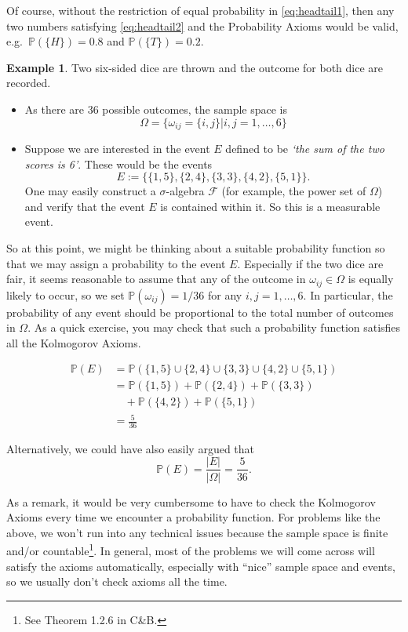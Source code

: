 \documentclass[
]{book}
\newcommand{\bbP}{\mathbb{P}}
\newcommand{\cF}{{\mathcal F}}
\theoremstyle{definition}
\theoremstyle{definition}
\newtheorem{example}{Example}[chapter]
\theoremstyle{definition}
\theoremstyle{definition}
\theoremstyle{remark}
\begin{document}
Of course, without the restriction of equal probability in \eqref{eq:headtail1}, then any two numbers satisfying \eqref{eq:headtail2} and the Probability Axioms would be valid, e.g.~\(\bbP(\{H\})= 0.8\) and \(\bbP(\{T\}) = 0.2.\)

\begin{example}
Two six-sided dice are thrown and the outcome for both dice are recorded.

\begin{itemize}
\item
  As there are 36 possible outcomes, the sample space is
  \[
  \Omega = \big\{ \omega_{ij}=\{i,j\} | i,j =1,\dots,6 \big\}
  \]
\item
  Suppose we are interested in the event \(E\) defined to be \emph{`the sum of the two scores is 6'}. These would be the events
  \[
  E := \big\{ \{1,5\}, \{2,4\}, \{3,3\}, \{4,2\}, \{5,1\} \big\}.
  \]
  One may easily construct a \(\sigma\)-algebra \(\cF\) (for example, the power set of \(\Omega\)) and verify that the event \(E\) is contained within it. So this is a measurable event.
\end{itemize}

So at this point, we might be thinking about a suitable probability function so that we may assign a probability to the event \(E\).
Especially if the two dice are fair, it seems reasonable to assume that any of the outcome in \(\omega_{ij}\in\Omega\) is equally likely to occur, so we set \(\bbP(\omega_{ij}) = 1/36\) for any \(i,j =1,\dots,6\).
In particular, the probability of any event should be proportional to the total number of outcomes in \(\Omega\).
As a quick exercise, you may check that such a probability function satisfies all the Kolmogorov Axioms.

\begin{align*}
\bbP(E) &= 
\bbP\left( \{1,5\} \cup \{2,4\} \cup \{3,3\} \cup \{4,2\} \cup \{5,1\} \right) \\
&= \bbP( \{1,5\}) + \bbP(\{2,4\}) + \bbP(\{3,3\}) \\
& \hspace{1em} + \bbP(\{4,2\}) + \bbP(\{5,1\}) \\
&= \frac{5}{36}
\end{align*}

Alternatively, we could have also easily argued that
\[
\bbP(E) = \frac{|E|}{|\Omega|} = \frac{5}{36}.
\]
\end{example}

As a remark, it would be very cumbersome to have to check the Kolmogorov Axioms every time we encounter a probability function.
For problems like the above, we won't run into any technical issues because the sample space is finite and/or countable\footnote{See Theorem 1.2.6 in C\&B.}.
In general, most of the problems we will come across will satisfy the axioms automatically, especially with ``nice'' sample space and events, so we usually don't check axioms all the time.
\end{document}
